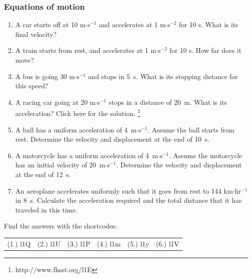             \subsubsection{ Equations of motion}
            \nopagebreak
          \label{m38796*id79517}\begin{enumerate}[noitemsep, label=\textbf{\arabic*}. ] 
            \label{m38796*uid144}\item A car starts off at 10 m$\ensuremath{\cdot}$s${}^{-1}$ and accelerates at 1 m$\ensuremath{\cdot}$s${}^{-2}$ for 10 s. What is its final velocity?\newline
\label{m38796*uid145}\item A train starts from rest, and accelerates at 1 m$\ensuremath{\cdot}$s${}^{-2}$ for 10 s. How far does it move?\newline
\label{m38796*uid146}\item A bus is going 30 m$\ensuremath{\cdot}$s${}^{-1}$ and stops in 5~s. What is its stopping distance for this speed?\newline
\label{m38796*uid147}\item A racing car going at 20 m$\ensuremath{\cdot}$s${}^{-1}$ stops in a distance of 20~m. What is its acceleration?\newline
    Click here for the solution.\newline
    \footnote{http://www.fhsst.org/l1E}
\label{m38796*uid148}\item A ball has a uniform acceleration of 4~m$\ensuremath{\cdot}$s${}^{-1}$. Assume the ball starts from rest. Determine the velocity and displacement at the end of 10~s.\newline
\label{m38796*uid149}\item A motorcycle has a uniform acceleration of 4~m$\ensuremath{\cdot}$s${}^{-1}$. Assume the motorcycle has an initial velocity of 20~m$\ensuremath{\cdot}$s${}^{-1}$. Determine the velocity and displacement at the end of 12~s.\newline
\label{m38796*uid150}\item An aeroplane accelerates uniformly such that it goes from rest to 144 km$\ensuremath{\cdot}$hr${}^{-1}$in 8~s. Calculate the acceleration required and the total distance that it has traveled in this time.\newline
\end{enumerate}
    \label{m38796*cid11}
\par {} Find the answers with the shortcodes:
 \par \begin{tabular}[h]{cccccc}
 (1.) l1Q  &  (2.) l1U  &  (3.) l1P  &  (4.) l1m  &  (5.) l1y  &  (6.) l1V  & \end{tabular}
